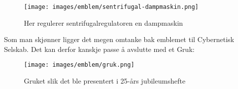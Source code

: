 \begin{figure}[h!]
	\centering
	\texttt{[image: images/emblem/sentrifugal-dampmaskin.png]}
	\label{fig:sentrifugal-dampmaskin}
	\caption{Her regulerer sentrifugalregulatoren en dampmaskin}
\end{figure}

\newpage

Som man skjønner ligger det megen omtanke bak emblemet til Cybernetisk Selskab. Det kan derfor kanskje passe å avslutte med et Gruk:

\begin{figure}[h!]
	\centering
	\texttt{[image: images/emblem/gruk.png]}
	\label{fig:gruk}
	\caption{Gruket slik det ble presentert i 25-års jubileumshefte}
\end{figure}
